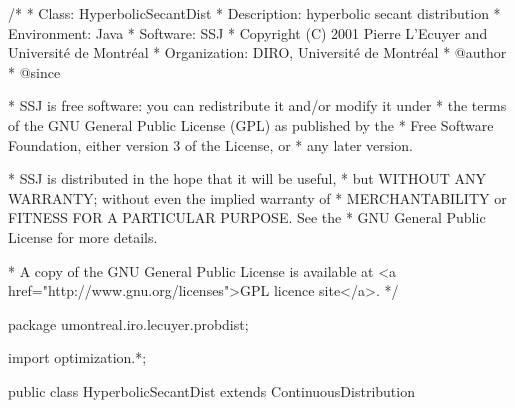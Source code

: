 \begin{code}
\begin{hide}
/*
 * Class:        HyperbolicSecantDist
 * Description:  hyperbolic secant distribution
 * Environment:  Java
 * Software:     SSJ 
 * Copyright (C) 2001  Pierre L'Ecuyer and Université de Montréal
 * Organization: DIRO, Université de Montréal
 * @author       
 * @since

 * SSJ is free software: you can redistribute it and/or modify it under
 * the terms of the GNU General Public License (GPL) as published by the
 * Free Software Foundation, either version 3 of the License, or
 * any later version.

 * SSJ is distributed in the hope that it will be useful,
 * but WITHOUT ANY WARRANTY; without even the implied warranty of
 * MERCHANTABILITY or FITNESS FOR A PARTICULAR PURPOSE.  See the
 * GNU General Public License for more details.

 * A copy of the GNU General Public License is available at
   <a href="http://www.gnu.org/licenses">GPL licence site</a>.
 */
\end{hide}
package umontreal.iro.lecuyer.probdist;
\begin{hide}
import optimization.*;
\end{hide}

public class HyperbolicSecantDist extends ContinuousDistribution\begin{hide} {
   protected double mu;
   protected double sigma;
   private static final double ZLIMB = 500.0;
   private static final double ZLIMS = 50.0;

   private static class Optim implements Uncmin_methods
   {
      private int n;
      private double[] xi;

      public Optim (double[] x, int n)
      {
         this.n = n;
         this.xi = new double[n];
         System.arraycopy (x, 0, this.xi, 0, n);
      }

      public double f_to_minimize (double[] p)
      {
         double sum = 0.0;

         if (p[2] <= 0.0)
            return 1e200;

         for (int i = 0; i < n; i++)
            sum -= Math.log (density (p[1], p[2], xi[i]));

         return sum;
      }

      public void gradient (double[] x, double[] g)
      {
      }

      public void hessian (double[] x, double[][] h)
      {
      }
   }
\end{hide}
\end{code}

